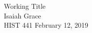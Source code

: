 \documentclass[12pt]{article}
\begin{document}
\begin{titlepage}
\centering
Working Title\\
\vspace{50pt}
Isaiah Grace\\
HIST 441
February 12, 2019
\end{titlepage}
\end{document}
